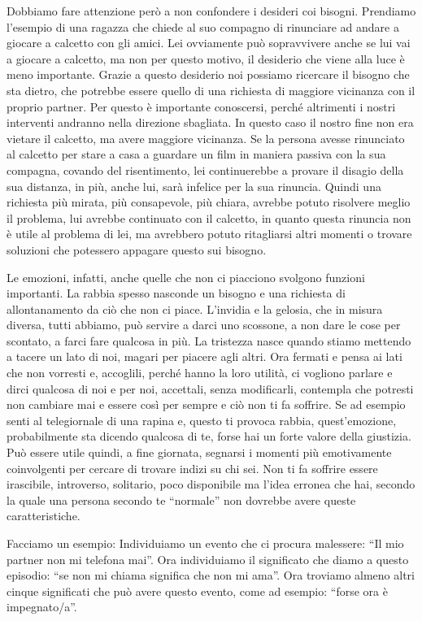 \documentclass[12pt]{book} %
\begin{document}
Dobbiamo fare attenzione però a non confondere i desideri coi bisogni. Prendiamo l'esempio di una
ragazza che chiede al suo compagno di rinunciare ad andare a giocare a calcetto con gli amici. Lei ovviamente può
sopravvivere anche se lui vai a giocare a calcetto, ma non per questo motivo, il desiderio che viene alla luce è meno
importante. Grazie a questo desiderio noi possiamo ricercare il bisogno che sta dietro, che potrebbe essere quello di
una richiesta di maggiore vicinanza con il proprio partner. Per questo è importante conoscersi, perché altrimenti i nostri interventi
andranno nella direzione sbagliata. In questo caso il nostro fine non era vietare il calcetto, ma avere maggiore
vicinanza. Se la persona avesse rinunciato al calcetto per stare a casa a guardare un film in maniera passiva con la
sua compagna, covando del risentimento, lei continuerebbe a provare il disagio della sua distanza, in più, anche lui,
sarà infelice per la sua rinuncia. Quindi una richiesta più mirata, più consapevole, più chiara, avrebbe potuto
risolvere meglio il problema, lui avrebbe continuato con il calcetto, in quanto questa rinuncia non è utile al problema
di lei, ma avrebbero potuto ritagliarsi altri momenti o trovare soluzioni che potessero appagare questo sui bisogno.

Le emozioni, infatti, anche quelle che non ci piacciono svolgono funzioni importanti. La rabbia spesso nasconde un
bisogno e una richiesta di allontanamento da ciò che non ci piace.
L'invidia e la gelosia, che in misura diversa, tutti abbiamo, può servire a darci uno scossone, a non
dare le cose per scontato, a farci fare qualcosa in più. La tristezza nasce quando stiamo mettendo a
tacere un lato di noi, magari per piacere agli altri. 
Ora fermati e pensa ai lati che non vorresti e, accoglili, perché hanno la loro utilità, ci
vogliono parlare e dirci qualcosa di noi e per noi, accettali, senza modificarli, contempla che potresti non cambiare
mai e essere così per sempre e ciò non ti fa soffrire. Se ad esempio senti al telegiornale di una rapina e, questo ti
provoca rabbia, quest'emozione, probabilmente sta dicendo qualcosa di te, forse hai un forte
valore della giustizia. Può essere utile quindi, a fine giornata, segnarsi i momenti più emotivamente coinvolgenti per
cercare di trovare indizi su chi sei. Non ti fa soffrire essere irascibile, introverso, solitario, poco disponibile ma
l'idea erronea che hai, secondo la quale una persona secondo te “normale” non dovrebbe avere queste caratteristiche.

Facciamo un esempio: Individuiamo un evento che ci procura malessere: “Il mio partner non mi telefona mai”. Ora
individuiamo il significato che diamo a questo episodio: “se non mi chiama significa che non mi ama”. Ora troviamo
almeno altri cinque significati che può avere questo evento, come ad esempio: “forse ora è impegnato/a”.
\end{document}
